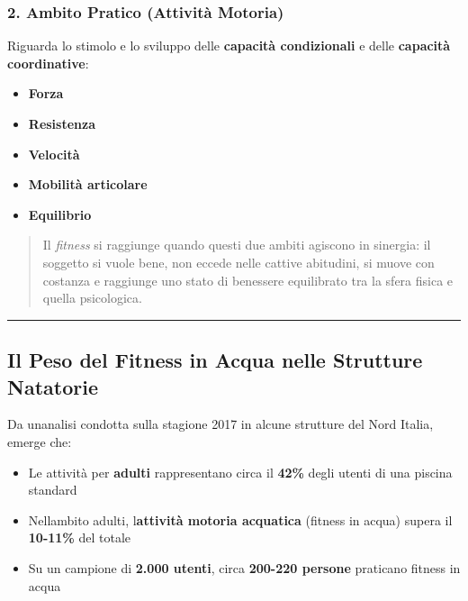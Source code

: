 \documentclass[a4paper,11pt]{article}
\providecommand{\tightlist}{%
  \setlength{\itemsep}{0pt}\setlength{\parskip}{0pt}}
\begin{document}
\subsubsection{2. Ambito Pratico (Attività
      Motoria)}\label{ambito-pratico-attivituxe0-motoria}

Riguarda lo stimolo e lo sviluppo delle \textbf{capacità condizionali} e
delle \textbf{capacità coordinative}:

\begin{itemize}
      \tightlist
      \item
            \textbf{Forza}
      \item
            \textbf{Resistenza}
      \item
            \textbf{Velocità}
      \item
            \textbf{Mobilità articolare}
      \item
            \textbf{Equilibrio}
\end{itemize}

\begin{quote}
      Il \emph{fitness} si raggiunge quando questi due ambiti agiscono in
      sinergia: il soggetto si vuole bene, non eccede nelle cattive abitudini,
      si muove con costanza e raggiunge uno stato di benessere equilibrato tra
      la sfera fisica e quella psicologica.
\end{quote}

\begin{center}\rule{0.5\linewidth}{0.5pt}\end{center}

\subsection{Il Peso del Fitness in Acqua nelle Strutture
      Natatorie}\label{il-peso-del-fitness-in-acqua-nelle-strutture-natatorie}

Da un\textquotesingle analisi condotta sulla stagione 2017 in alcune
strutture del Nord Italia, emerge che:

\begin{itemize}
      \tightlist
      \item
            Le attività per \textbf{adulti} rappresentano circa il \textbf{42\%}
            degli utenti di una piscina standard
      \item
            Nell\textquotesingle ambito adulti,
            l\textquotesingle{}\textbf{attività motoria acquatica} (fitness in
            acqua) supera il \textbf{10-11\%} del totale
      \item
            Su un campione di \textbf{2.000 utenti}, circa \textbf{200-220
                  persone} praticano fitness in acqua
\end{itemize}
\end{document}
